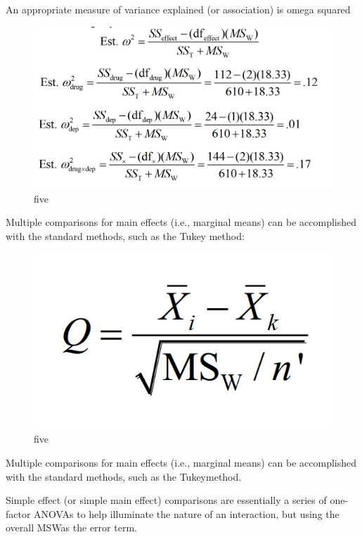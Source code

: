 \documentclass[]{book}
\theoremstyle{definition}
\theoremstyle{definition}
\theoremstyle{definition}
\theoremstyle{remark}
\begin{document}
An appropriate measure of variance explained (or association) is omega
squared

\begin{figure}
\centering
\includegraphics{img/hicksfa17.png}
\caption{five}
\end{figure}

Multiple comparisons for main effects (i.e., marginal means) can be
accomplished with the standard methods, such as the Tukey method:

\begin{figure}
\centering
\includegraphics{img/hicksfa18.png}
\caption{five}
\end{figure}

Multiple comparisons for main effects (i.e., marginal means) can be
accomplished with the standard methods, such as the Tukeymethod.

Simple effect (or simple main effect) comparisons are essentially a
series of one-factor ANOVAs to help illuminate the nature of an
interaction, but using the overall MSWas the error term.
\end{document}
